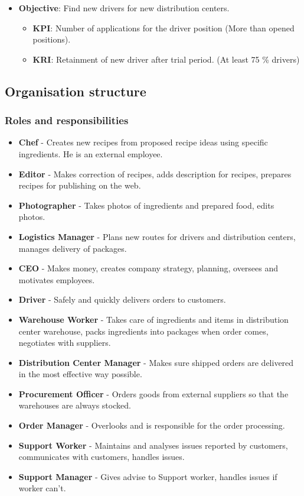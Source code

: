 \documentclass[11pt,a4paper]{article}
\begin{document}
\begin{itemize}
\begin{itemize}
\begin{itemize}
        \end{itemize}
        \item \textbf{Objective}: Find new drivers for new distribution centers.
        \begin{itemize}
            \item \textbf{KPI}: Number of applications for the driver position (More than opened positions).
            \item \textbf{KRI}: Retainment of new driver after trial period. (At least 75 \% drivers)
        \end{itemize}
    \end{itemize}
\end{itemize}


\newpage
\subsection{Organisation structure}
\subsubsection{Roles and responsibilities}

\begin{itemize}
    \item \textbf{Chef} - Creates new recipes from proposed recipe ideas using specific ingredients. He is an external employee.
    \item \textbf{Editor} - Makes correction of recipes, adds description for recipes, prepares recipes for publishing on the web.
    \item \textbf{Photographer} - Takes photos of ingredients and prepared food, edits photos.
    \item \textbf{Logistics Manager} - Plans new routes for drivers and distribution centers, manages delivery of packages.
    \item \textbf{CEO} - Makes money, creates company strategy, planning, oversees and motivates employees.
    \item \textbf{Driver} - Safely and quickly delivers orders to customers.
    \item \textbf{Warehouse Worker} - Takes care of ingredients and items in distribution center warehouse, packs ingredients into packages when order comes, negotiates with suppliers.
    \item \textbf{Distribution Center Manager} - Makes sure shipped orders are delivered in the most effective way possible.
    \item \textbf{Procurement Officer} - Orders goods from external suppliers so that the warehouses are always stocked.
    \item \textbf{Order Manager} - Overlooks and is responsible for the order processing.
    \item \textbf{Support Worker} - Maintains and analyses issues reported by customers, communicates with customers, handles issues.
    \item \textbf{Support Manager} - Gives advise to Support worker, handles issues if worker can't.
\end{itemize}
\end{document}
